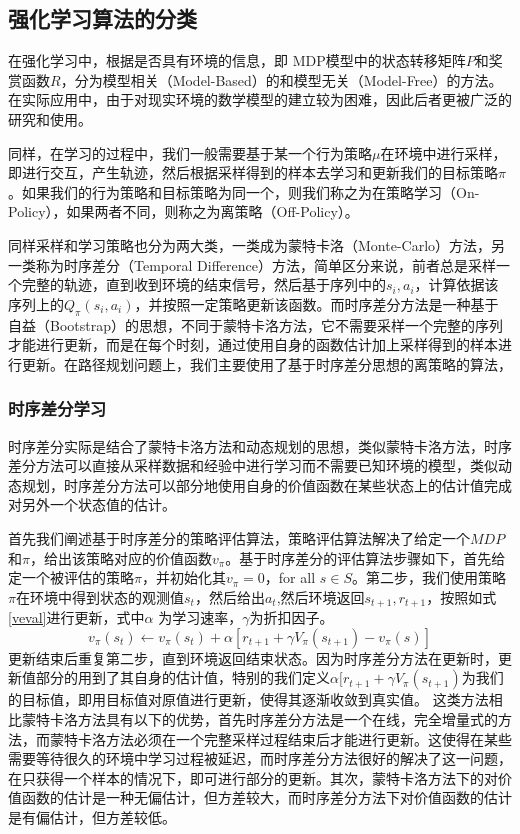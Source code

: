 \documentclass{standalone}
\begin{document}
\subsection{强化学习算法的分类}
在强化学习中，根据是否具有环境的信息，即 MDP模型中的状态转移矩阵$P$和奖赏函数$R$，分为模型相关（Model-Based）的和模型无关（Model-Free）的方法。在实际应用中，由于对现实环境的数学模型的建立较为困难，因此后者更被广泛的研究和使用。\par
同样，在学习的过程中，我们一般需要基于某一个行为策略$\mu$在环境中进行采样，即进行交互，产生轨迹，然后根据采样得到的样本去学习和更新我们的目标策略$\pi$。如果我们的行为策略和目标策略为同一个，则我们称之为在策略学习（On-Policy），如果两者不同，则称之为离策略（Off-Policy）。\par
同样采样和学习策略也分为两大类，一类成为蒙特卡洛（Monte-Carlo）方法，另一类称为时序差分（Temporal Difference）方法，简单区分来说，前者总是采样一个完整的轨迹，直到收到环境的结束信号，然后基于序列中的$s_i, a_i$，计算依据该序列上的$Q_{\pi}(s_i, a_i)$，并按照一定策略更新该函数。而时序差分方法是一种基于自益（Bootstrap）的思想，不同于蒙特卡洛方法，它不需要采样一个完整的序列才能进行更新，而是在每个时刻，通过使用自身的函数估计加上采样得到的样本进行更新。在路径规划问题上，我们主要使用了基于时序差分思想的离策略的算法，
\subsubsection{时序差分学习}
时序差分实际是结合了蒙特卡洛方法和动态规划的思想，类似蒙特卡洛方法，时序差分方法可以直接从采样数据和经验中进行学习而不需要已知环境的模型，类似动态规划，时序差分方法可以部分地使用自身的价值函数在某些状态上的估计值完成对另外一个状态值的估计。\par
首先我们阐述基于时序差分的策略评估算法，策略评估算法解决了给定一个$MDP$和$\pi$，给出该策略对应的价值函数$v_{\pi}$。基于时序差分的评估算法步骤如下，首先给定一个被评估的策略$\pi$，并初始化其$v_{\pi} = 0$，for all $s \in S$。第二步，我们使用策略$\pi$在环境中得到状态的观测值$s_t$，然后给出$a_t$,然后环境返回$s_{t+1}, r_{t+1}$，按照如式\ref{veval}进行更新，式中$\alpha$ 为学习速率，$\gamma$为折扣因子。
    \begin{equation}
    \label{veval}
        v_{\pi}(s_t) \leftarrow v_{\pi}(s_t) + \alpha[r_{t+1} + \gamma V_{\pi}(s_{t+1}) - v_{\pi}(s)]
    \end{equation}
更新结束后重复第二步，直到环境返回结束状态。因为时序差分方法在更新时，更新值部分的用到了其自身的估计值，特别的我们定义$\alpha[r_{t+1} + \gamma V_{\pi}(s_{t+1})$为我们的目标值，即用目标值对原值进行更新，使得其逐渐收敛到真实值。
这类方法相比蒙特卡洛方法具有以下的优势，首先时序差分方法是一个在线，完全增量式的方法，而蒙特卡洛方法必须在一个完整采样过程结束后才能进行更新。这使得在某些需要等待很久的环境中学习过程被延迟，而时序差分方法很好的解决了这一问题，在只获得一个样本的情况下，即可进行部分的更新。其次，蒙特卡洛方法下的对价值函数的估计是一种无偏估计，但方差较大，而时序差分方法下对价值函数的估计是有偏估计，但方差较低。
\end{document}
